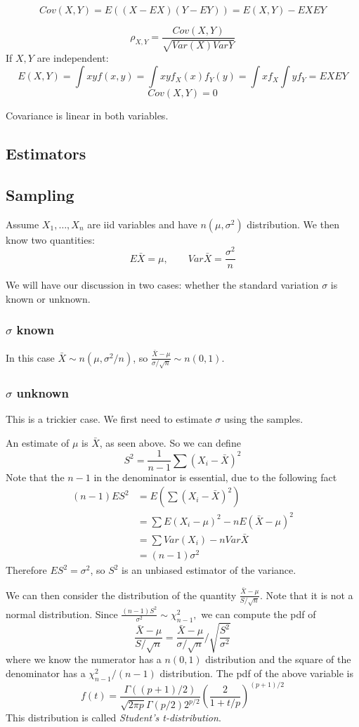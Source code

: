 \documentclass[12pt]{amsart}
\numberwithin{equation}{section}
\theoremstyle{plain}
\theoremstyle{definition}
\begin{document}
$$Cov(X,Y) = E((X-EX)(Y-EY))=E(X,Y)-EXEY$$

$$
\rho_{X,Y}= \frac{Cov(X,Y)}{\sqrt{Var(X)Var{Y}}}
$$
If $X, Y$ are independent:
$$
E(X,Y) = \int xyf(x,y) = \int xyf_X(x)f_Y(y) = \int xf_X\int yf_Y = EXEY
$$
$$
Cov(X,Y) = 0
$$

Covariance is linear in both variables.

\subsection{Estimators}

\subsection{Sampling}
Assume $X_1,\ldots, X_n$ are iid variables and have $n(\mu, \sigma^2)$ distribution. We then know two quantities:
$$
E\bar{X} = \mu, \qquad Var\bar{X} = \frac{\sigma^2}{n}
$$

We will have our discussion in two cases: whether the standard variation $\sigma$ is known or unknown.
\subsubsection{$\sigma$ known}
In this case 
$\bar{X}\sim n(\mu, \sigma^2/n)$, so $\frac{\bar{X}-\mu}{\sigma/\sqrt{n}}\sim n(0,1)$.

\subsubsection{$\sigma$ unknown} 
This is a trickier case. We first need to estimate $\sigma$ using the samples.

An estimate of $\mu$ is $\bar{X}$, as seen above. So we can define
$$
S^2 = \frac{1}{n-1}\sum(X_i-\bar{X})^2
$$ 
Note that the $n-1$ in the denominator is essential, due to the following fact
\begin{equation}
\begin{split}
(n-1)ES^2 &= E(\sum(X_i-\bar{X})^2)\\
&=\sum E(X_i-\mu)^2-nE(\bar{X}-\mu)^2 \\
& =\sum Var(X_i) - nVar\bar{X}\\
&=(n-1)\sigma^2
\end{split}
\end{equation}
Therefore $ES^2=\sigma^2$, so $S^2$ is an unbiased estimator of the variance.

We can then consider the distribution of the quantity $\frac{\bar{X}-\mu}{S/\sqrt{n}}$. Note that it is not a normal distribution. Since 
$
\frac{(n-1)S^2}{\sigma^2}\sim \chi^2_{n-1},
$
we can compute the pdf of
$$
\frac{\bar{X}-\mu}{S/\sqrt{n}} = \frac{\bar{X}-\mu}{\sigma/\sqrt{n}}/\sqrt{\frac{S^2}{\sigma^2}}
$$
where we know the numerator has a $n(0,1)$ distribution and the square of the denominator has a $\chi^2_{n-1}/(n-1)$ distribution. The pdf of the above variable is
$$
f(t) = \frac{\Gamma((p+1)/2)}{\sqrt{2\pi p}\Gamma(p/2)2^{p/2}}(\frac{2}{1+t/p})^{(p+1)/2}
$$
This distribution is called {\em Student's t-distribution}.
\end{document}
